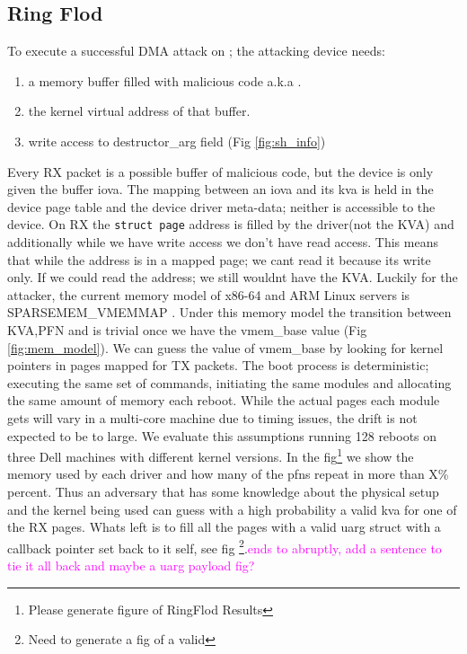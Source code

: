 \subsection{Ring Flod}
To execute a successful DMA attack on \shinfo; the attacking device needs: \begin{enumerate}
    \item a memory buffer filled with malicious code a.k.a \mabaf.
    \item the kernel virtual address of that buffer.
    \item write access to destructor\_arg field (Fig \ref{fig:sh_info})
\end{enumerate} 
Every RX packet is a possible buffer of malicious code, but the device is only given the buffer iova. The mapping between an iova and its kva is held in the device page table and the device driver meta-data; neither is accessible to the device. On RX the \texttt{struct page} address is filled by the driver(not the KVA) and additionally while we have write access we don't have read access. This means that while the \page address is in a mapped page; we cant read it because its write only. If we could read the \page address; we still wouldnt have the KVA. \newline 
Luckily for the attacker, the current memory model of x86-64 and ARM Linux servers is SPARSEMEM\_VMEMMAP \cite{mem_model}. Under this memory model the transition between KVA,PFN and \page is trivial once we have the vmem\_base value (Fig \ref{fig:mem_model}). We can guess the value of vmem\_base by looking for kernel pointers in pages mapped for TX packets.\newline 
The boot process is deterministic; executing the same set of commands, initiating the same modules and allocating the same amount of memory each reboot. While the actual pages each module gets will vary in a multi-core machine due to timing issues, the drift is not expected to be to large. We evaluate this assumptions running 128 reboots on three Dell machines with different kernel versions. In the fig\footnote{Please generate figure of RingFlod Results} we show the memory used by each driver and how many of the pfns repeat in more than X\% percent. Thus an adversary that has some knowledge about the physical setup and the kernel being used can guess with a high probability a valid kva for one of the RX pages. Whats left is to fill all the pages with a valid uarg struct with a callback pointer set back to it self, see fig \footnote{Need to generate a fig of a valid \uarg}.\textcolor{magenta}{ends to abruptly, add a sentence to tie it all back and maybe a uarg payload fig? }

